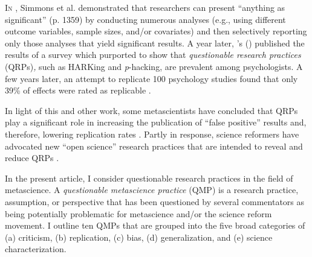 \documentclass[authordate, meta, issue]{jote-new-article}
\author[1]{Mark Rubin\orcid{0000-0002-6483-8561}}
\affil[1]{Durham University}
\begin{document}
\begin{frontmatter}
  \maketitle
  \begin{abstract}
    \printabstracttext
  \end{abstract}
\end{frontmatter}



\lettrine{I}{n} \citeyear{Simmons2011}, Simmons et al. demonstrated that researchers can present “anything as significant” (p. 1359) by conducting numerous analyses (e.g., using different outcome variables, sample sizes, and/or covariates) and then selectively reporting only those analyses that yield significant results. A year later, \citeauthor{John2012}'s \mbox{(\hspace*{-.21em}\citeyear{John2012})} published the results of a survey which purported to show that \emph{questionable research practices }(QRPs)\emph{, }such as HARKing and \emph{p}-hacking, are prevalent among psychologists. A few years later, an attempt to replicate 100 psychology studies found that only 39\% of effects were rated as replicable \parencite{Collaboration2015}.



In light of this and other work, some metascientists have concluded that QRPs play a significant role in increasing the publication of “false positive” results and, therefore, lowering replication rates \parencites[e.g.,][]{Bishop2019}{Bishop2020}{Munafò2017}{Nosek2012}{Collaboration2015}{Schimmack2020}{Spellman2018}. Partly in response, science reformers have advocated new “open science” research practices that are intended to reveal and reduce QRPs \parencites[e.g., preregistered research plans, publicly accessible research data and materials][]{Munafò2017}.



In the present article, I consider questionable research practices in the field of metascience. A \emph{questionable metascience practice }(QMP) is a research practice, assumption, or perspective that has been questioned by several commentators as being potentially problematic for metascience and/or the science reform movement. I outline ten QMPs that are grouped into the five broad categories of (a) criticism, (b) replication, (c) bias, (d) generalization, and (e) science characterization.
\end{document}
